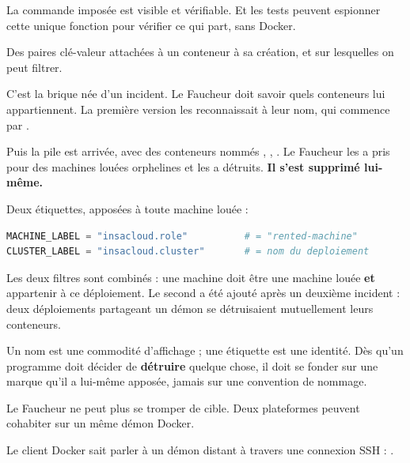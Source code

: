 \apport
La commande imposée est visible et vérifiable. Et les tests peuvent espionner
cette unique fonction pour vérifier ce qui part, sans Docker.


\quoi
Des paires clé-valeur attachées à un conteneur à sa création, et sur lesquelles
on peut filtrer.

\pourquoi
C'est la brique née d'un incident. Le Faucheur doit savoir quels conteneurs lui
appartiennent. La première version les reconnaissait à leur nom, qui commence
par .

Puis la pile  est arrivée, avec des conteneurs nommés
, , . Le Faucheur
les a pris pour des machines louées orphelines et les a détruits.
\textbf{Il s'est supprimé lui-même.}

\role
Deux étiquettes, apposées à toute machine louée :

\begin{lstlisting}[language=Python]
MACHINE_LABEL = "insacloud.role"          # = "rented-machine"
CLUSTER_LABEL = "insacloud.cluster"       # = nom du deploiement
\end{lstlisting}

Les deux filtres sont combinés : une machine doit être une machine louée
\textbf{et} appartenir à ce déploiement. Le second a été ajouté après un
deuxième incident : deux déploiements partageant un démon se détruisaient
mutuellement leurs conteneurs.

\begin{retenir}
Un nom est une commodité d'affichage ; une étiquette est une identité. Dès
qu'un programme doit décider de \textbf{détruire} quelque chose, il doit se
fonder sur une marque qu'il a lui-même apposée, jamais sur une convention de
nommage.
\end{retenir}

\apport
Le Faucheur ne peut plus se tromper de cible. Deux plateformes peuvent
cohabiter sur un même démon Docker.


\quoi
Le client Docker sait parler à un démon distant à travers une connexion SSH :
.

